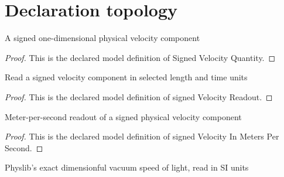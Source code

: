 \section{Declaration topology}
\begin{definition}
  \label{def:physics:phyx-mini-0558:phyxminiproblems-problemphyxmini0558-signedvelocityquantity}
  A signed one-dimensional physical velocity component
\end{definition}
\begin{proof}
  This is the declared model definition of Signed Velocity Quantity.
\end{proof}
\begin{definition}
  \label{def:physics:phyx-mini-0558:phyxminiproblems-problemphyxmini0558-signedvelocityreadout}
  Read a signed velocity component in selected length and time units
\end{definition}
\begin{proof}
  This is the declared model definition of signed Velocity Readout.
\end{proof}
\begin{definition}
  \label{def:physics:phyx-mini-0558:phyxminiproblems-problemphyxmini0558-signedvelocityinmeterspersecond}
  Meter-per-second readout of a signed physical velocity component
\end{definition}
\begin{proof}
  This is the declared model definition of signed Velocity In Meters Per Second.
\end{proof}
\begin{definition}
  \label{def:physics:phyx-mini-0558:phyxminiproblems-problemphyxmini0558-vacuumlightspeedinmeterspersecond}
  Physlib's exact dimensionful vacuum speed of light, read in SI units
\end{definition}
